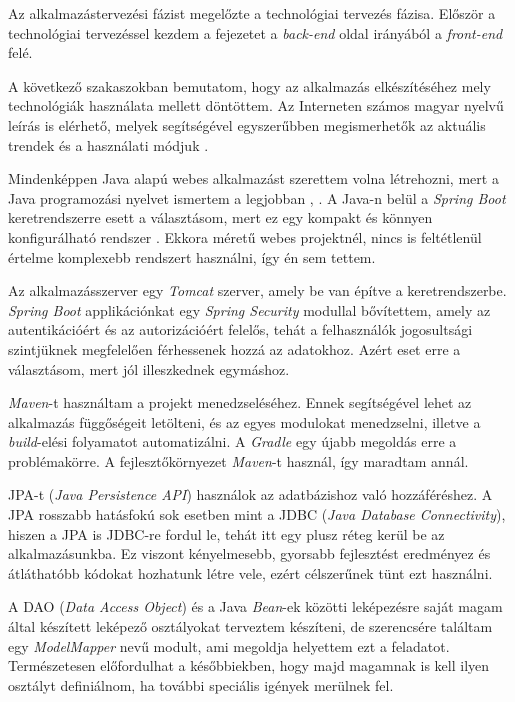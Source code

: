 
Az alkalmazástervezési fázist megelőzte a technológiai tervezés fázisa. Először a technológiai tervezéssel kezdem a fejezetet a \textit{back-end} oldal irányából a \textit{front-end} felé.


A következő szakaszokban bemutatom, hogy az alkalmazás elkészítéséhez mely technológiák használata mellett döntöttem. Az Interneten számos magyar nyelvű leírás is elérhető, melyek segítségével egyszerűbben megismerhetők az aktuális trendek és a használati módjuk \cite{6}.


Mindenképpen Java alapú webes alkalmazást szerettem volna létrehozni, mert a Java programozási nyelvet ismertem a legjobban \cite{7}, \cite{14}. A Java-n belül a \textit{Spring Boot} keretrendszerre esett a választásom, mert ez egy kompakt és könnyen konfigurálható rendszer \cite{3}. Ekkora méretű webes projektnél, nincs is feltétlenül értelme komplexebb rendszert használni, így én sem tettem.

Az alkalmazásszerver egy \textit{Tomcat} szerver, amely be van építve a keretrendszerbe. \textit{Spring Boot} applikációnkat egy \textit{Spring Security} modullal bővítettem, amely az autentikációért és az autorizációért felelős, tehát a felhasználók jogosultsági szintjüknek megfelelően férhessenek hozzá az adatokhoz. Azért eset erre a választásom, mert jól illeszkednek egymáshoz.

\textit{Maven}-t használtam a projekt menedzseléséhez. Ennek segítségével lehet az alkalmazás függőségeit letölteni, és az egyes modulokat menedzselni, illetve a \textit{build}-elési folyamatot automatizálni. A \textit{Gradle} egy újabb megoldás erre a problémakörre. A fejlesztőkörnyezet \textit{Maven}-t használ, így maradtam annál.

JPA-t (\textit{Java Persistence API}) használok az adatbázishoz való hozzáféréshez. A JPA rosszabb hatásfokú sok esetben mint a JDBC (\textit{Java Database Connectivity}), hiszen a JPA is JDBC-re fordul le, tehát itt egy plusz réteg kerül be az alkalmazásunkba. Ez viszont kényelmesebb, gyorsabb fejlesztést eredményez és átláthatóbb kódokat hozhatunk létre vele, ezért célszerűnek tünt ezt használni.

A DAO (\textit{Data Access Object}) és a Java \textit{Bean}-ek közötti leképezésre saját magam által készített leképező osztályokat terveztem készíteni, de szerencsére találtam egy \textit{ModelMapper} nevű modult, ami megoldja helyettem ezt a feladatot. Természetesen előfordulhat a későbbiekben, hogy majd magamnak is kell ilyen osztályt definiálnom, ha további speciális igények merülnek fel.

